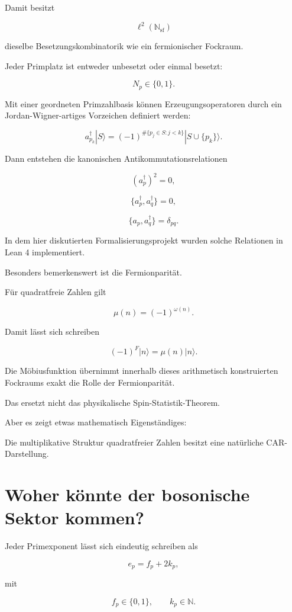 \documentclass[11pt,a4paper]{article}
\begin{document}
Damit besitzt


\[
\ell^2(\mathbb N_{\mathrm{sf}})
\]


dieselbe Besetzungskombinatorik wie ein fermionischer Fockraum.


Jeder Primplatz ist entweder unbesetzt oder einmal besetzt:


\[
N_p\in\{0,1\}.
\]


Mit einer geordneten Primzahlbasis können Erzeugungsoperatoren durch ein Jordan-Wigner-artiges Vorzeichen definiert werden:


\[
a_{p_k}^\dagger|S\rangle
=
(-1)^{\#\{p_j\in S:j<k\}}
|S\cup\{p_k\}\rangle.
\]


Dann entstehen die kanonischen Antikommutationsrelationen


\[
(a_p^\dagger)^2=0,
\]


\[
\{a_p^\dagger,a_q^\dagger\}=0,
\]


\[
\{a_p,a_q^\dagger\}
=
\delta_{pq}.
\]


In dem hier diskutierten Formalisierungsprojekt wurden solche Relationen in Lean 4 implementiert.


Besonders bemerkenswert ist die Fermionparität.


Für quadratfreie Zahlen gilt


\[
\mu(n)=(-1)^{\omega(n)}.
\]


Damit lässt sich schreiben


\[
(-1)^F|n\rangle
=
\mu(n)|n\rangle.
\]


Die Möbiusfunktion übernimmt innerhalb dieses arithmetisch konstruierten Fockraums exakt die Rolle der Fermionparität.


Das ersetzt nicht das physikalische Spin-Statistik-Theorem.


Aber es zeigt etwas mathematisch Eigenständiges:


Die multiplikative Struktur quadratfreier Zahlen besitzt eine natürliche CAR-Darstellung.





\section{Woher könnte der bosonische Sektor kommen?}


Jeder Primexponent lässt sich eindeutig schreiben als


\[
e_p=f_p+2k_p,
\]


mit


\[
f_p\in\{0,1\},
\qquad
k_p\in\mathbb N.
\]
\end{document}
